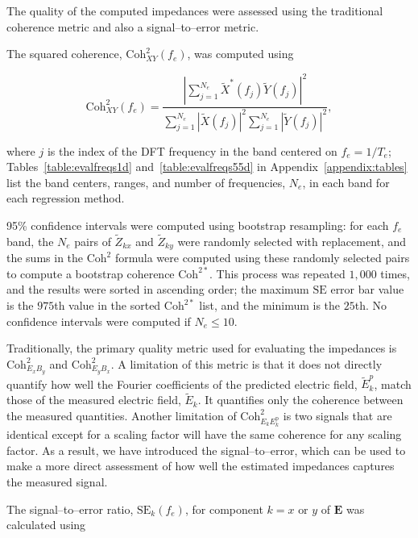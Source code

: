 \documentclass[pdflatex,sn-basic]{sn-jnl}%
\begin{document}
The quality of the computed impedances were assessed using the traditional coherence metric and also a signal--to--error metric.

The squared coherence, $\text{Coh}^2_{XY}(f_e)$, was computed using

\begin{equation}
  \text{Coh}^2_{XY}(f_e) = \frac{\left|\displaystyle\sum_{j=1}^{N_e}\widetilde{X}^*(f_j)\widetilde{Y}(f_j)\right|^2}{\displaystyle\sum_{j=1}^{N_e} \left|\widetilde{X}(f_j)\right|^2\sum_{j=1}^{N_e} \left|\widetilde{Y}(f_j)\right|^2},
\end{equation}

\noindent
where $j$ is the index of the DFT frequency in the band centered on $f_e=1/T_e$; Tables~\ref{table:evalfreqs1d} and~\ref{table:evalfreqs55d} in Appendix~\ref{appendix:tables} list the band centers, ranges, and number of frequencies, $N_e$, in each band for each regression method.

95\% confidence intervals were computed using bootstrap resampling: for each $f_e$ band, the $N_e$ pairs of $\widetilde{Z}_{kx}$ and $\widetilde{Z}_{ky}$ were randomly selected with replacement, and the sums in the $\text{Coh}^2$ formula were computed using these randomly selected pairs to compute a bootstrap coherence $\text{Coh}^{2*}$. This process was repeated $1,000$ times, and the results were sorted in ascending order; the maximum $\text{SE}$ error bar value is the $975$th value in the sorted $\text{Coh}^{2*}$ list, and the minimum is the $25$th. No confidence intervals were computed if $N_e\le 10$.

Traditionally, the primary quality metric used for evaluating the impedances is $\text{Coh}^2_{E_xB_y}$ and $\text{Coh}^2_{E_yB_x}$. A limitation of this metric is that it does not directly quantify how well the Fourier coefficients of the predicted electric field, $\widetilde{E}^p_k$, match those of the measured electric field, $\widetilde{E}_k$. It quantifies only the coherence between the measured quantities. Another limitation of $\text{Coh}^2_{E_kE^\text{p}_k}$ is two signals that are identical except for a scaling factor will have the same coherence for any scaling factor. As a result, we have introduced the signal--to--error, which can be used to make a more direct assessment of how well the estimated impedances captures the measured signal.

The signal--to--error ratio, $\text{SE}_k(f_e)$, for component $k=x\mbox{ or }y$ of $\mathbf{E}$ was calculated using
\end{document}
